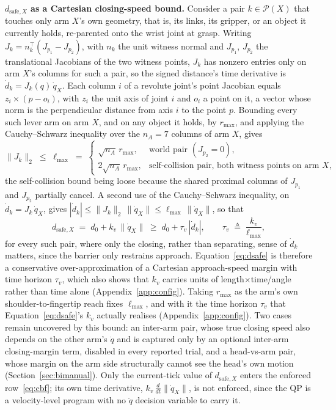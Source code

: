 \documentclass[12pt,a4paper,twoside,openright]{report}
\newcommand{\qdot}{\dot{q}}
\begin{document}
\textbf{$d_{\text{safe},X}$ as a Cartesian closing-speed bound.} Consider a pair $k \in \mathcal{P}(X)$ that touches only arm $X$'s own geometry, that is, its links, its gripper, or an object it currently holds, re-parented onto the wrist joint at grasp. Writing $J_k = n_k^{\top}(J_{p_1} - J_{p_2})$, with $n_k$ the unit witness normal and $J_{p_1}$, $J_{p_2}$ the translational Jacobians of the two witness points, $J_k$ has nonzero entries only on arm $X$'s columns for such a pair, so the signed distance's time derivative is $\dot{d}_k = J_k(q)\,\qdot_X$. Each column $i$ of a revolute joint's point Jacobian equals $z_i \times (p - o_i)$, with $z_i$ the unit axis of joint $i$ and $o_i$ a point on it, a vector whose norm is the perpendicular distance from axis $i$ to the point $p$. Bounding every such lever arm on arm $X$, and on any object it holds, by $r_{\max}$, and applying the Cauchy--Schwarz inequality over the $n_A = 7$ columns of arm $X$, gives
\begin{equation}
\|J_k\|_2 \;\le\; \ell_{\max} \;=\;
\begin{cases}
\sqrt{n_A}\,r_{\max}, & \text{world pair } (J_{p_2} = 0),\\
2\sqrt{n_A}\,r_{\max}, & \text{self-collision pair, both witness points on arm } X,
\end{cases}
\label{eq:lmax}
\end{equation}
the self-collision bound being loose because the shared proximal columns of $J_{p_1}$ and $J_{p_2}$ partially cancel. A second use of the Cauchy--Schwarz inequality, on $\dot{d}_k = J_k\,\qdot_X$, gives $|\dot{d}_k| \le \|J_k\|_2\,\|\qdot_X\| \le \ell_{\max}\,\|\qdot_X\|$, so that
\begin{equation}
d_{\text{safe},X} \;=\; d_0 + k_v\,\|\qdot_X\| \;\ge\; d_0 + \tau_v\,|\dot{d}_k|, \qquad \tau_v \;\triangleq\; \frac{k_v}{\ell_{\max}},
\label{eq:tauv}
\end{equation}
for every such pair, where only the closing, rather than separating, sense of $\dot{d}_k$ matters, since the barrier only restrains approach. Equation~\eqref{eq:dsafe} is therefore a conservative over-approximation of a Cartesian approach-speed margin with time horizon $\tau_v$, which also shows that $k_v$ carries units of length$\times$time/angle rather than time alone (Appendix~\ref{app:config}). Taking $r_{\max}$ as the arm's own shoulder-to-fingertip reach fixes $\ell_{\max}$, and with it the time horizon $\tau_v$ that Equation~\eqref{eq:dsafe}'s $k_v$ actually realises (Appendix~\ref{app:config}). Two cases remain uncovered by this bound: an inter-arm pair, whose true closing speed also depends on the other arm's $\qdot$ and is captured only by an optional inter-arm closing-margin term, disabled in every reported trial, and a head-vs-arm pair, whose margin on the arm side structurally cannot see the head's own motion (Section~\ref{sec:bimanual}). Only the current-tick value of $d_{\text{safe},X}$ enters the enforced row~\eqref{eq:cbf}; its own time derivative, $k_v\,\frac{d}{dt}\|\qdot_X\|$, is not enforced, since the QP is a velocity-level program with no $\ddot{q}$ decision variable to carry it.
\end{document}
